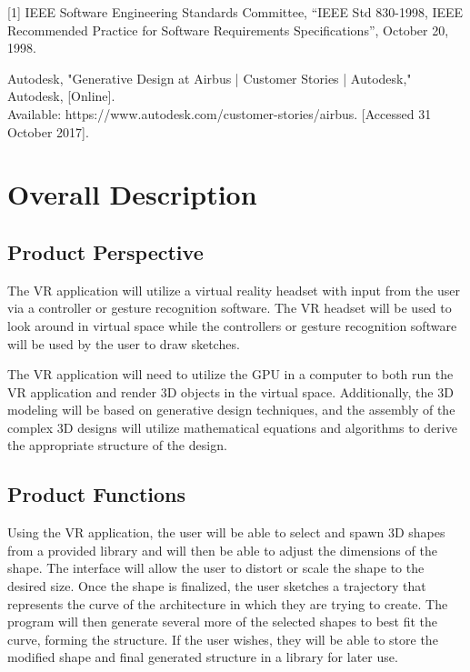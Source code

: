 \documentclass[letterpaper,draftclsnofoot,onecolumn,10 pt,compsoc]{IEEEtran}
\begin{document}
[1] IEEE Software Engineering Standards Committee, “IEEE Std 830-1998, IEEE Recommended Practice for Software Requirements Specifications”, October 20, 1998.
\newline

\noindent[2] Autodesk, "Generative Design at Airbus | Customer Stories | Autodesk," Autodesk, [Online]. \\Available: https://www.autodesk.com/customer-stories/airbus. [Accessed 31 October 2017].


\newpage

\section{Overall Description}
\subsection{Product Perspective}
The VR application will utilize a virtual reality headset with input from the user via a controller or gesture recognition software. The VR headset will be used to look around in virtual space while the controllers or gesture recognition software will be used by the user to draw sketches. 
\newline

\noindent The VR application will need to utilize the GPU in a computer to both run the VR application and render 3D objects in the virtual space. Additionally, the 3D modeling will be based on generative design techniques, and the assembly of the complex 3D designs will utilize mathematical equations and algorithms to derive the appropriate structure of the design.

\subsection{Product Functions}
Using the VR application, the user will be able to select and spawn 3D shapes from a provided library and will then be able to adjust the dimensions of the shape. The interface will allow the user to distort or scale the shape to the desired size. Once the shape is finalized, the user sketches a trajectory that represents the curve of the architecture in which they are trying to create. The program will then generate several more of the selected shapes to best fit the curve, forming the structure. If the user wishes, they will be able to store the modified shape and final generated structure in a library for later use.
\end{document}
